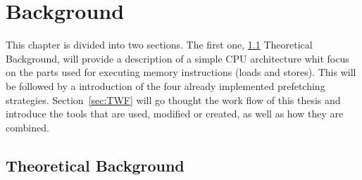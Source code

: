 \chapter{Background}
\label{chap:bg}
This chapter is divided into two sections. The first one, \ref{sec:ThB} Theoretical Background, will provide a description of a simple CPU architecture whit focus on the parts used for executing memory instructions (loads and stores). This will be followed by a introduction of the four already implemented prefetching strategies. Section~\ref{sec:TWF} will go thought the work flow of this thesis and introduce the tools that are used, modified or created, as well as how they are combined.
\section{Theoretical Background}
\label{sec:ThB}

